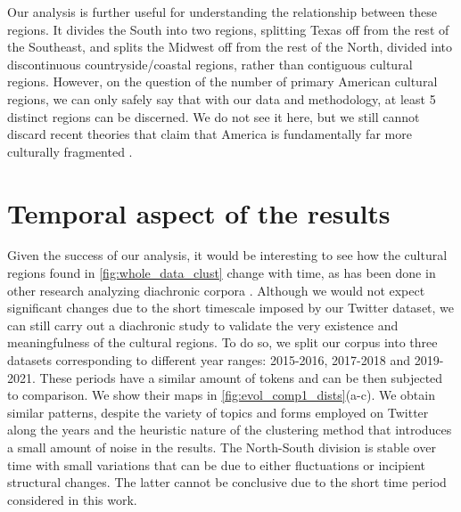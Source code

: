 \documentclass[../thesis.tex]{subfiles}
\begin{document}
Our analysis is further useful for understanding the relationship between these regions.
It divides the South into two regions, splitting Texas off from the rest of the
Southeast, and splits the Midwest off from the rest of the North, divided into
discontinuous countryside/coastal regions, rather than contiguous cultural regions.
However, on the question of the number of primary American cultural regions, we can only
safely say that with our data and methodology, at least 5 distinct regions can be
discerned. We do not see it here, but we still cannot discard recent theories that claim
that America is fundamentally far more culturally fragmented
\cite{GarreauNineNations1996,LieskeRegionalSubcultures1993,WoodardAmericanNations2012}.


\section{Temporal aspect of the results}
Given the success of our analysis, it would be interesting to see how the cultural
regions found in \cref{fig:whole_data_clust} change with time, as has been done in other
research analyzing diachronic corpora
\cite{BochkarevAverageWord2015,BentleyBooksAverage2014,KarjusQuantifyingDynamics2020,MomeniModelingEvolution2018,AlshaabiStorywranglerMassive2021}.
Although we would not expect significant changes due to the short timescale imposed by
our Twitter dataset, we can still carry out a diachronic study to validate the very
existence and meaningfulness of the cultural regions. To do so, we split our corpus into
three datasets corresponding to different year ranges: 2015-2016, 2017-2018 and
2019-2021. These periods have a similar amount of tokens and can be then subjected to
comparison. We show their maps in
\cref{fig:evol_comp1_dists}(a-c). We obtain similar patterns, despite the variety of
topics and forms employed on Twitter along the years and the heuristic nature of the
clustering method that introduces a small amount of noise in the results. The
North-South division is stable over time with small variations that can be due to either
fluctuations or incipient structural changes. The latter cannot be conclusive due to the
short time period considered in this work.
\end{document}
